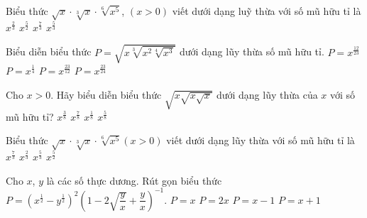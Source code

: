 \begin{ex}%
	Biểu thức $\sqrt{x}\cdot\sqrt[3]{x}\cdot\sqrt[6]{x^5}$, $(x>0)$ viết dưới dạng luỹ thừa với số mũ hữu tỉ là 
	\choice
	{$x^{\tfrac{2}{3}}$}
	{$x^{\tfrac{5}{2}}$}
	{$x^{\tfrac{7}{3}}$}
	{\True $x^{\tfrac{5}{3}}$}
\end{ex}
\begin{ex}%
	Biểu diễn biểu thức $P=\sqrt{x\sqrt[3]{x^2\sqrt[4]{x^3}}}$ dưới dạng lũy thừa số mũ hữu tỉ. 
	\choice
	{$P=x^{\tfrac{12}{23}}$}
	{$P=x^{\tfrac{1}{4}}$}
	{$P=x^{\tfrac{23}{12}}$}
	{\True $P=x^{\tfrac{23}{24}}$}
\end{ex}
\begin{ex}%
	Cho $x>0$. Hãy biểu diễn biểu thức $\sqrt{x\sqrt{x\sqrt{x}}}$ dưới dạng lũy thừa của $x$ với số mũ hữu tỉ?
	\choice
	{$x^{\tfrac{3}{8}}$}
	{\True $x^{\tfrac{7}{8}}$}
	{$x^{\tfrac{1}{8}}$}
	{$x^{\tfrac{5}{8}}$}
\end{ex}
\begin{ex}%
	Biểu thức $\sqrt{x}\cdot\sqrt[3]{x}\cdot\sqrt[6]{x^5} (x>0)$ viết dưới dạng lũy thừa với số mũ hữu tỉ là 
	\choice
	{$x^{\tfrac{7}{3}}$}
	{$x^{\tfrac{2}{3}}$}
	{\True $x^{\tfrac{5}{3}}$}
	{$x^{\tfrac{5}{2}}$}
\end{ex}
\begin{ex}%
	Cho $x$, $y$ là các số thực dương. Rút gọn biểu thức $P=\left(x^{\tfrac{1}{2}}-y^{\tfrac{1}{2}}\right)^2\left(1-2\sqrt{\dfrac{y}{x}}+\dfrac{y}{x}\right)^{-1}$. 
	\choice
	{\True $P=x$}
	{$P=2x$}
	{$P=x-1$}
	{$P=x+1$}
\end{ex}
